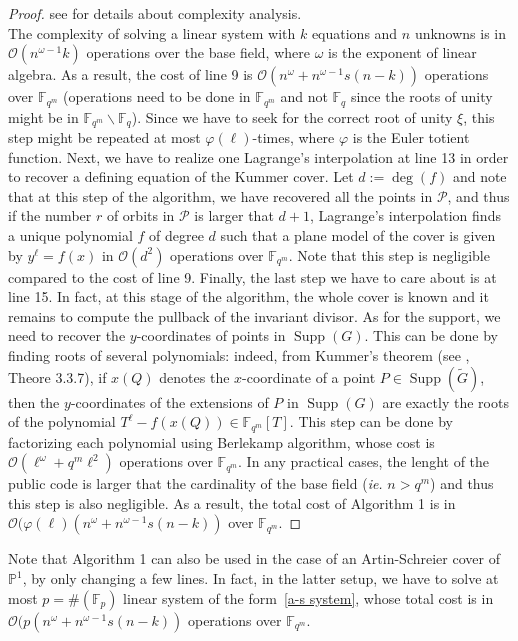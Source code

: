 \documentclass[10pt]{article}
\theoremstyle{definition}
\theoremstyle{definition}
\theoremstyle{definition}
\newcommand{\PP}{\mathbb{P}}
\newcommand{\calO}{\mathcal{O}}
\newcommand{\Fqm}{\mathbb{F}_{q^m}}
\newcommand{\Fq}{\mathbb{F}_q}
\newcommand{\w}{\omega}
\newcommand{\PR}{\mathcal{P}}
\newcommand{\Supp}{\operatorname{Supp}}
\begin{document}
\begin{proof} see \cite{CF} for details about complexity analysis. \\
The complexity of solving a linear system with $k$ equations and $n$ unknowns is in $\calO(n^{\w-1}k)$ operations over the base field, where $\w$ is the exponent of linear algebra. As a result, the cost of line 9 is $\calO(n^{\w}+n^{\w-1}s(n-k))$ operations over $\Fqm$ (operations need to be done in $\Fqm$ and not $\Fq$ since the roots of unity might be in $\Fqm \backslash \Fq$). Since we have to seek for the correct root of unity $\xi$, this step might be repeated at most $\varphi(\ell)$-times, where $\varphi$ is the Euler totient function. Next, we have to realize one Lagrange's interpolation at line 13 in order to recover a defining equation of the Kummer cover. Let $d:=\deg(f)$ and note that at this step of the algorithm, we have recovered all the points in $\PR$, and thus if the number $r$ of orbits in $\PR$ is larger that $d+1$, Lagrange's interpolation finds a unique polynomial $f$ of degree $d$ such that a plane model of the cover is given by $y^{\ell}=f(x)$ in $\calO(d^2)$ operations over $\Fqm$. Note that this step is negligible compared to the cost of line 9. Finally, the last step we have to care about is at line 15. In fact, at this stage of the algorithm, the whole cover is known and it remains to compute the pullback of the invariant divisor. As for the support, we need to recover the $y$-coordinates of points in $\Supp(G)$. This can be done by finding roots of several polynomials: indeed, from Kummer's theorem (see \cite{Sti}, Theore 3.3.7), if $x(Q)$ denotes the $x$-coordinate of a point $P \in \Supp(\tilde{G})$, then the $y$-coordinates of the extensions of $P$ in $\Supp(G)$ are exactly the roots of the polynomial $T^{\ell}-f(x(Q)) \in \Fqm[T]$. This step can be done by factorizing each polynomial using Berlekamp algorithm, whose cost is $\calO(\ell^{\w}+q^m\ell^{2})$ operations over $\Fqm$. In any practical cases, the lenght of the public code is larger that the cardinality of the base field (\textit{ie.} $n > q^m$) and thus this step is also negligible. As a result, the total cost of Algorithm 1 is in $\calO(\varphi(\ell)(n^{\w}+n^{\w-1}s(n-k))$ over $\Fqm$.
\end{proof}

Note that Algorithm 1 can also be used in the case of an Artin-Schreier cover of $\PP^1$, by only changing a few lines. In fact, in the latter setup, we have to solve at most $p = \#(\mathbb{F}_p)$ linear system of the form~\eqref{a-s system}, whose total cost is in $\calO(p(n^{\w}+n^{\w-1}s(n-k))$ operations over $\Fqm$.
\end{document}

